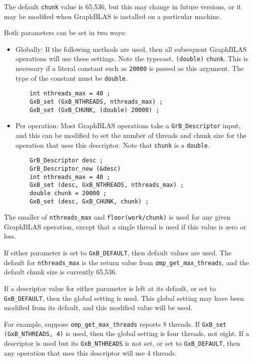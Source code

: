 \documentclass[12pt]{article}
\begin{document}
{The default \verb'chunk' value is 65,536, but this may change in future versions,
or it may be modified when GraphBLAS is installed on a particular machine.

Both parameters can be set in two ways:

\begin{itemize}

\item Globally:  If the following methods are used, then all subsequent
GraphBLAS operations will use these settings.  Note the typecast,
\verb'(double)' \verb'chunk'.  This is necessary if a literal constant such as
\verb'20000' is passed as this argument.  The type of the constant must be
\verb'double'.

    {\footnotesize
    \begin{verbatim}
    int nthreads_max = 40 ;
    GxB_set (GxB_NTHREADS, nthreads_max) ;
    GxB_set (GxB_CHUNK, (double) 20000) ; \end{verbatim} }

\item Per operation:  Most GraphBLAS operations take a \verb'GrB_Descriptor'
input, and this can be modified to set the number of threads and chunk
size for the operation that uses this descriptor.  Note that \verb'chunk'
is a \verb'double'.

    {\footnotesize
    \begin{verbatim}
    GrB_Descriptor desc ;
    GrB_Descriptor_new (&desc)
    int nthreads_max = 40 ;
    GxB_set (desc, GxB_NTHREADS, nthreads_max) ;
    double chunk = 20000 ;
    GxB_set (desc, GxB_CHUNK, chunk) ; \end{verbatim} }

\end{itemize}

The smaller of \verb'nthreads_max' and \verb'floor(work/chunk)' is used for any
given GraphBLAS operation, except that a single thread is used if this value is
zero or less.

If either parameter is set to \verb'GxB_DEFAULT', then default values are used.
The default for \verb'nthreads_max' is the return value from
\verb'omp_get_max_threads', and the default chunk size is currently 65,536.

If a descriptor value for either parameter is left at its default, or set to
\verb'GxB_DEFAULT', then the global setting is used.  This global setting may
have been modified from its default, and this modified value will be used.

For example, suppose \verb'omp_get_max_threads' reports 8 threads.  If \newline
\verb'GxB_set (GxB_NTHREADS, 4)' is used, then the global setting is four
threads, not eight.  If a descriptor is used but its \verb'GxB_NTHREADS' is not
set, or set to \verb'GxB_DEFAULT', then any operation that uses this descriptor
will use 4 threads.

}
\end{document}

